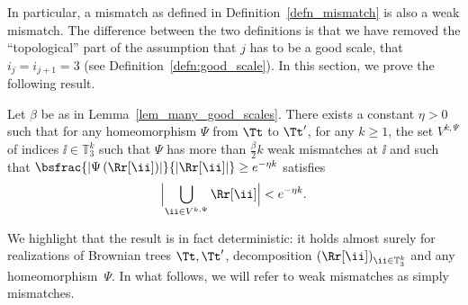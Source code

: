 In particular, a mismatch as defined in Definition~\ref{defn_mismatch} is also a weak mismatch.
The difference between the two definitions is that we have removed the ``topological'' part of the assumption that $j$ has to be a good scale, \ie that $i_j=i_{j+1}=3$ (see Definition~\ref{defn:good_scale}).
In this section, we prove the following result.
\begin{proposition}\label{prop:mass of bad regions is small}
Let $\beta$ be as in Lemma~\ref{lem_many_good_scales}.
There exists a constant $\eta>0$ such that for any homeomorphism $\Psi$ from $\Tt$ to $\Tt'$, for any $k\geq 1$, the set $V^{k,\Psi}$ of indices $\ii \in \mathbb{T}_3^k$ such that $\Psi$ has more than $\frac{\beta}{2} k$ weak mismatches at $\ii$ and such that $\bsfrac{\left| \Psi \left( \Rr[\ii] \right) \right|}{\left| \Rr[\ii] \right|} \geq e^{-\eta k}$ satisfies\vspace*{-3pt}
\begin{align*}
\Bigl|\bigcup_{\ii \in V^{k,\Psi}}\Rr[\ii]\Bigr| < e^{-\eta k}.
\end{align*}
\end{proposition}
We highlight that the result is in fact deterministic: it holds almost surely for realizations of Brownian trees $\Tt, \Tt'$, decomposition $(\Rr[\ii])_{\ii\in \mathbb{T}_3^k}$ and any homeomorphism~$\Psi$.
In what follows, we will refer to weak mismatches as simply mismatches.
